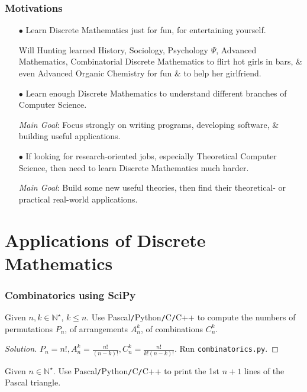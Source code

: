 \documentclass{beamer}
\begin{document}
\begin{frame}
	\frametitle{Motivations}
	\begin{itemize}
		\item[$\bullet$] Learn Discrete Mathematics just for fun, for entertaining yourself.
		
		\begin{example}
			{\sc Will Hunting} learned History, Sociology, Psychology $\Psi$, Advanced Mathematics, Combinatorial Discrete Mathematics to flirt hot girls in bars, \& even Advanced Organic Chemistry for fun \& to help her girlfriend.
		\end{example}
		
		\item[$\bullet$] Learn enough Discrete Mathematics to understand different branches of Computer Science.
		
		{\it Main Goal}: Focus strongly on writing programs, developing software, \& building useful applications.
		\item[$\bullet$] If looking for research-oriented jobs, especially Theoretical Computer Science, then need to learn Discrete Mathematics much harder.
		
		{\it Main Goal}: Build some new useful theories, then find their theoretical- or practical real-world applications.
	\end{itemize}
\end{frame}

\section{Applications of Discrete Mathematics}

\begin{frame}
	\frametitle{Combinatorics using SciPy}
	\begin{problem}
		Given $n,k\in\mathbb{N}^\star$, $k\le n$. Use {\sf Pascal{\tt/}Python{\tt/}C{\tt/}C++} to compute the numbers of permutations $P_n$, of arrangements $A_n^k$, of combinations $C_n^k$.
	\end{problem}
	
	\begin{proof}[Solution]
		$P_n = n!,A_n^k = \frac{n!}{(n - k)!},C_n^k = \frac{n!}{k!(n - k)!}$. Run {\tt combinatorics.py}.		
	\end{proof}
	
	\begin{problem}
		Given $n\in\mathbb{N}^\star$. Use {\sf Pascal{\tt/}Python{\tt/}C{\tt/}C++} to print the 1st $n + 1$ lines of the Pascal triangle.
	\end{problem}
\end{frame}
\end{document}
